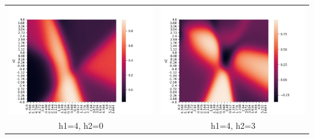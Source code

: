 \documentclass[twoside]{article}
\begin{document}
\begin{tabular}{ cc }
	\includegraphics[scale=0.5]{heatmaps1/A4_0} & \includegraphics[scale=0.5]{heatmaps1/A4_3} \\ 
	h1=4, h2=0 & h1=4, h2=3 \\ 
\end{tabular}
\end{document}
